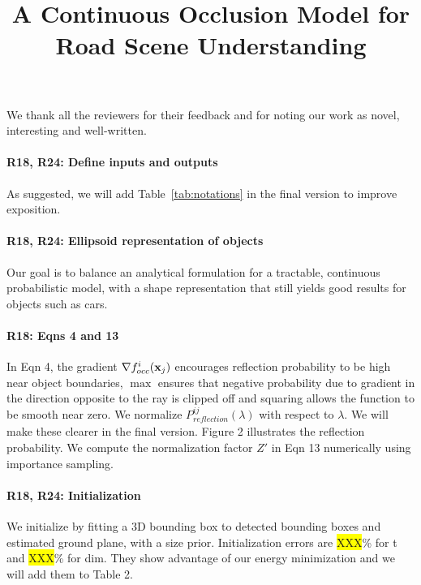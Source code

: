 \documentclass[10pt,twocolumn,letterpaper]{article}
\newcommand{\hili}[1]{\colorbox{yellow}{#1}}
\begin{document}
\title{A Continuous Occlusion Model for Road Scene Understanding}  %

\maketitle
\thispagestyle{empty}

We thank all the reviewers for their feedback and for noting our work as novel, interesting and well-written.

\vspace{-0.4cm}
\paragraph{R18, R24: Define inputs and outputs} As suggested, we will add Table~\ref{tab:notations} in the final version to improve exposition.

\vspace{-0.4cm}
\paragraph{R18, R24: Ellipsoid representation of objects} Our goal is to balance an analytical formulation for a tractable, continuous probabilistic model, with a shape representation that still yields good results for objects such as cars.

\vspace{-0.4cm}
\paragraph{R18: Eqns 4 and 13}
In Eqn 4, the gradient $\nabla {f^i_{occ}}(\mathbf{x}_j)$ encourages reflection probability to be high near object boundaries, $\max$ ensures that negative probability due to gradient in the direction opposite to the ray is clipped off and squaring allows the function to be smooth near zero. We normalize $P^{ij}_{\textit{reflection}}(\lambda)$  with respect to $\lambda$. We will make these clearer in the final version. Figure 2 illustrates the reflection probability. We compute the normalization factor $Z'$ in Eqn 13 numerically using importance sampling.

\vspace{-0.4cm}
\paragraph{R18, R24: Initialization}
We initialize by fitting a 3D bounding box to detected bounding boxes and estimated ground plane, with a size prior. Initialization errors are \hili{XXX}\% for t and \hili{XXX}\% for dim. They show advantage of our energy minimization and we will add them to Table 2.
\end{document}
